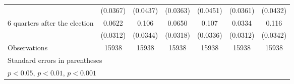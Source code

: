 \begin{table}[htbp]
\begin{tabular}{l*{6}{c}}
                    &    (0.0367)         &    (0.0437)         &    (0.0363)         &    (0.0451)         &    (0.0361)         &    (0.0432)         \\
[1em]
 6 quarters after the election&      0.0622\sym{*}  &       0.106\sym{**} &      0.0650\sym{*}  &       0.107\sym{**} &      0.0334         &       0.116\sym{***}\\
                    &    (0.0312)         &    (0.0344)         &    (0.0318)         &    (0.0336)         &    (0.0312)         &    (0.0342)         \\
\hline
Observations        &       15938         &       15938         &       15938         &       15938         &       15938         &       15938         \\
\hline\hline
\multicolumn{7}{l}{\footnotesize Standard errors in parentheses}\\
\multicolumn{7}{l}{\footnotesize \sym{*} \(p<0.05\), \sym{**} \(p<0.01\), \sym{***} \(p<0.001\)}\\
\end{tabular}
\end{table}
